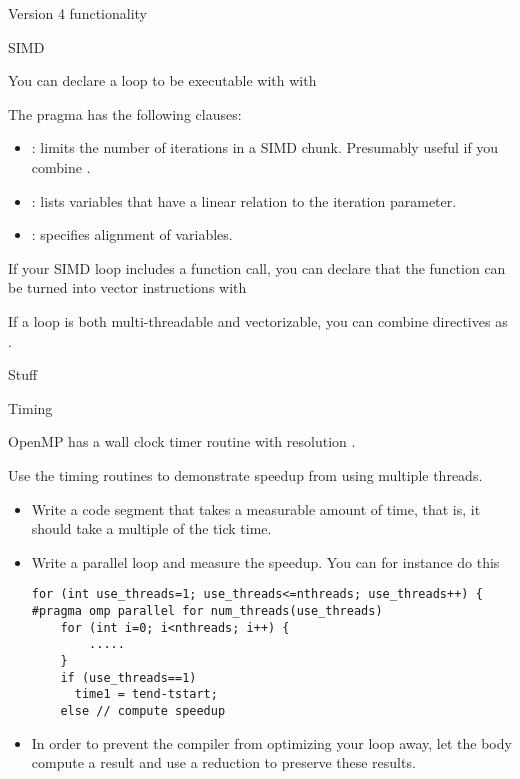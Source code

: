  {Version 4 functionality}

 {SIMD}

You can declare a loop to be executable with
 with
%

The  pragma has the following clauses:
\begin{itemize}
\item {}: limits the number of iterations in a
  SIMD chunk. Presumably useful if you combine .
\item {}: lists variables that have a linear
  relation to the iteration parameter.
\item {}: specifies alignment of variables.
\end{itemize}

If your SIMD loop includes a function call, you can declare that the
function can be turned into vector instructions with
%

If a loop is both multi-threadable and vectorizable, you can combine
directives as .

 {Stuff}

 {Timing}

OpenMP has a wall clock timer routine 
with resolution .

\begin{exercise}
  Use the timing routines to demonstrate speedup from using
  multiple threads.
  \begin{itemize}
  \item Write a code segment that takes a measurable amount of time, that is,
    it should take a multiple of the tick time.
  \item Write a parallel loop and measure the speedup. You can for instance do this
\begin{verbatim}
for (int use_threads=1; use_threads<=nthreads; use_threads++) {
#pragma omp parallel for num_threads(use_threads)
    for (int i=0; i<nthreads; i++) {
        .....
    }
    if (use_threads==1)
      time1 = tend-tstart;
    else // compute speedup
\end{verbatim}
\item In order to prevent the compiler from optimizing your loop away, let
  the body compute a result and use a reduction to preserve these results.
  \end{itemize}
\end{exercise}


